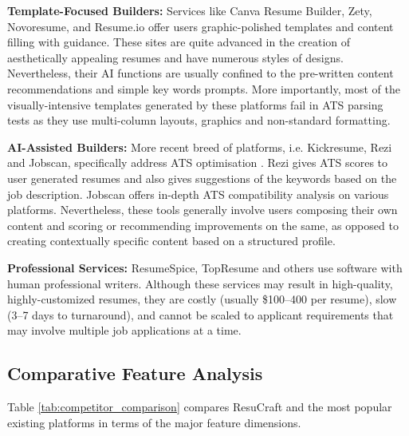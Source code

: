 \documentclass[12pt, a4paper, oneside]{report}
\begin{document}
\textbf{Template-Focused Builders:} Services like Canva Resume Builder, Zety, Novoresume, and Resume.io offer users graphic-polished templates and content filling with guidance. These sites are quite advanced in the creation of aesthetically appealing resumes and have numerous styles of designs. Nevertheless, their AI functions are usually confined to the pre-written content recommendations and simple key words prompts. More importantly, most of the visually-intensive templates generated by these platforms fail in ATS parsing tests as they use multi-column layouts, graphics and non-standard formatting\cite{resumeworded2022}.

\textbf{AI-Assisted Builders:} More recent breed of platforms, i.e. Kickresume, Rezi and Jobscan, specifically address ATS optimisation \cite{jobscan2021}. Rezi gives ATS scores to user generated resumes and also gives suggestions of the keywords based on the job description. Jobscan offers in-depth ATS compatibility analysis on various platforms. Nevertheless, these tools generally involve users composing their own content and scoring or recommending improvements on the same, as opposed to creating contextually specific content based on a structured profile.

\textbf{Professional Services:} ResumeSpice, TopResume and others use software with human professional writers. Although these services may result in high-quality, highly-customized resumes, they are costly (usually \$100--400 per resume), slow (3--7 days to turnaround), and cannot be scaled to applicant requirements that may involve multiple job applications at a time.

\subsection{Comparative Feature Analysis}

Table \ref{tab:competitor_comparison} compares ResuCraft and the most popular existing platforms in terms of the major feature dimensions.
\end{document}
